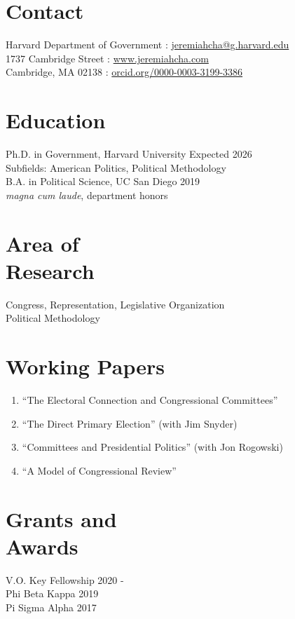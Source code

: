 \documentclass[margin, line]{res}
\begin{document}
\begin{resume}

\section{Contact} 
Harvard Department of Government \hfill \Letter: \href{mailto:jeremiahcha@g.harvard.edu}{jeremiahcha@g.harvard.edu}\\
1737 Cambridge Street \hfill \Mundus: \href{httsp://www.jeremiahcha.com}{www.jeremiahcha.com}\\
Cambridge, MA 02138 \hfill \Mundus: \href{https://orcid.org/0000-0003-3199-3386}{orcid.org/0000-0003-3199-3386}

\section{Education} 
Ph.D. in Government, Harvard University \hfill Expected 2026\\
\hspace*{5mm}Subfields: American Politics, Political Methodology \\
B.A. in Political Science, UC San Diego \hfill 2019\\
\hspace*{5mm}\textit{magna cum laude}, department honors

\section{Area of \\Research} 
Congress, Representation, Legislative Organization\\
Political Methodology

\section{Working Papers} 
\begin{enumerate}
	\item ``The Electoral Connection and Congressional Committees''
	\item ``The Direct Primary Election'' (with Jim Snyder)
	\item ``Committees and Presidential Politics'' (with Jon Rogowski)
	\item ``A Model of Congressional Review'' 
\end{enumerate}

\section{Grants and \\Awards}
V.O. Key Fellowship \hfill 2020 - \\
Phi Beta Kappa \hfill 2019\\
Pi Sigma Alpha \hfill 2017


\end{resume}
\end{document}
